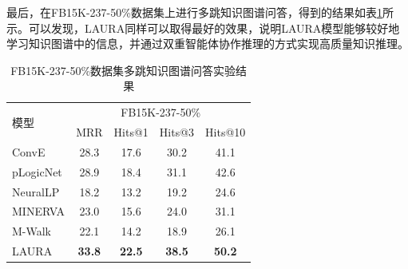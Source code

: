 \documentclass[algorithmlist, AutoFakeBold, AutoFakeSlant, figurelist, tablelist, nomlist, engineering]{seuthesix}
\begin{document}
最后，在FB15K-237-50\%数据集上进行多跳知识图谱问答，得到的结果如表\ref{Experiment2_FB15K-237-50}所示。可以发现，LAURA同样可以取得最好的效果，说明LAURA模型能够较好地学习知识图谱中的信息，并通过双重智能体协作推理的方式实现高质量知识推理。
\begin{table}[t]
  \centering
  \caption{FB15K-237-50\%数据集多跳知识图谱问答实验结果}
  \begin{tabular*}{0.95\textwidth}{@{\extracolsep{\fill}}lcccc}
    \toprule[1pt]
    \multirow{2}{*}{模型} & \multicolumn{4}{c}{FB15K-237-50\%}   \\
      & MRR & Hits@1 & Hits@3 & Hits@10 \\ \hline
    ConvE & 28.3 & 17.6 & 30.2 & 41.1 \\
    pLogicNet & 28.9 & 18.4 & 31.1 & 42.6 \\
    NeuralLP & 18.2 & 13.2 & 19.2 & 24.6 \\
    MINERVA & 23.0 & 15.6 & 24.0 & 31.1 \\
    M-Walk & 22.1 & 14.2 & 18.9 & 26.1 \\
    LAURA & \textbf{33.8} & \textbf{22.5} & \textbf{38.5} & \textbf{50.2} \\
    \bottomrule[1pt]
  \end{tabular*}
  \label{Experiment2_FB15K-237-50}
\end{table}
\end{document}
